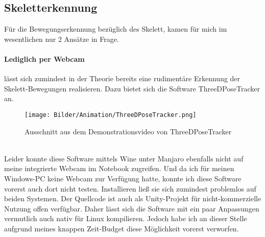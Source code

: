 \documentclass[a4paper, 12pt]{article}
\begin{document}
\subsection{Skeletterkennung}
\label{subsec:bodytracking}
Für die Bewegungserkennung bezüglich des Skelett, kamen für mich im wesentlichen nur 2 Ansätze in Frage.
\paragraph{Lediglich per Webcam} lässt sich zumindest in der Theorie bereits
eine rudimentäre Erkennung der Skelett-Bewegungen realisieren.
Dazu bietet sich die Software ThreeDPoseTracker\cite{threedposetracker} an\cite{tut-threedposetracker}.
\begin{figure}[htbp]
    \centering
    \texttt{[image: Bilder/Animation/ThreeDPoseTracker.png]}
    \caption{Ausschnitt aus dem Demonstrationsvideo von ThreeDPoseTracker\cite{threedposetracker}}
\end{figure}
\\Leider konnte diese Software mittels Wine\cite{wine} unter Manjaro\cite{manjaro}
ebenfalls nicht auf meine integrierte Webcam im Notebook zugreifen.
Und da ich für meinen Windows\cite{win10}-PC keine Webcam zur Verfügung hatte,
konnte ich diese Software vorerst auch dort nicht testen.
Installieren ließ sie sich zumindest problemlos auf beiden Systemen.
Der Quellcode ist auch als Unity-Projekt für nicht-kommerzielle Nutzung offen verfügbar.
Daher lässt sich die Software mit ein paar Anpassungen
vermutlich auch nativ für Linux\cite{linux} kompilieren.
Jedoch habe ich an dieser Stelle
aufgrund meines knappen Zeit-Budget diese Möglichkeit vorerst verworfen.
\newpage
\end{document}
